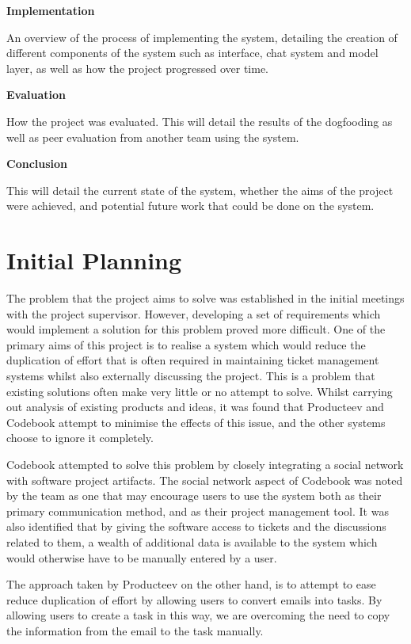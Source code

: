 \documentclass[a4paper]{l3proj}
\begin{document}
\textbf{Implementation}

An overview of the process of implementing the system, detailing the creation of different components of the system such as interface, chat system and model layer, as well as how the project progressed over time.

\textbf{Evaluation}

How the project was evaluated.  This will detail the results of the dogfooding as well as peer evaluation from another team using the system.

\textbf{Conclusion}

This will detail the current state of the system, whether the aims of the project were achieved, and potential future work that could be done on the system.


\chapter{Initial Planning}
\label{initial planning}

The problem that the project aims to solve was established in the initial meetings with the project supervisor. However, developing a set of requirements which would implement a solution for this problem proved more difficult. One of the primary aims of this project is to realise a system which would reduce the duplication of effort that is often required in maintaining ticket management systems whilst also externally discussing the project. This is a problem that existing solutions often make very little or no attempt to solve. Whilst carrying out analysis of existing products and ideas, it was found that Producteev and Codebook attempt to minimise the effects of this issue, and the other systems choose to ignore it completely.

Codebook attempted to solve this problem by closely integrating a social network with software project artifacts. The social network aspect of Codebook was noted by the team as one that may encourage users to use the system both as their primary communication method, and as their project management tool. It was also identified that by giving the software access to tickets and the discussions related to them, a wealth of additional data is available to the system which would otherwise have to be manually entered by a user.

The approach taken by Producteev on the other hand, is to attempt to ease reduce duplication of effort by allowing users to convert emails into tasks. By allowing users to create a task in this way, we are overcoming the need to copy the information from the email to the task manually.
\end{document}
